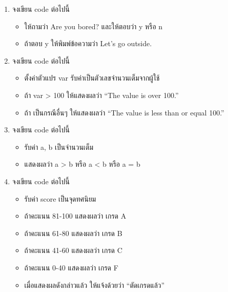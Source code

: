\begin{enumerate} 
\item  จงเขียน code ต่อไปนี้
\begin{itemize}
\item ให้ถามว่า Are you bored? และให้ตอบว่า y หรือ n
\item ถ้าตอบ y ให้พิมพ์ข้อความว่า Let’s go outside.
\end{itemize}
\item จงเขียน code ต่อไปนี้
\begin{itemize}
\item ตั้งค่าตัวแปร var รับค่าเป็นตัวเลขจำนวนเต็มจากผู้ใช้
\item ถ้า var > 100 ให้แสดงผลว่า “The value is over 100.”
\item ถ้า เป็นกรณีอื่นๆ ให้แสดงผลว่า “The value is less than or equal 100.”
\end{itemize}
\item จงเขียน code ต่อไปนี้
\begin{itemize}
\item รับค่า a, b เป็นจำนวนเต็ม
\item แสดงผลว่า a > b หรือ a < b หรือ a = b
\end{itemize}
\item จงเขียน code ต่อไปนี้
\begin{itemize}
\item รับค่า score เป็นจุดทศนิยม
\item ถ้าคะแนน 81-100 แสดงผลว่า เกรด A
\item ถ้าคะแนน 61-80  แสดงผลว่า เกรด B
\item ถ้าคะแนน 41-60 แสดงผลว่า เกรด C
\item ถ้าคะแนน 0-40 แสดงผลว่า เกรด F
\item เมื่อแสดงผลดังกล่าวแล้ว ให้แจ้งด้วยว่า “ตัดเกรดแล้ว”
\end{itemize}
\end{enumerate}
